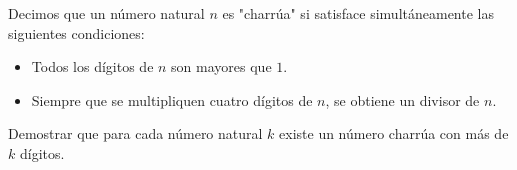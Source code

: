 Decimos que un número natural $n$ es "charrúa" si satisface simultáneamente las siguientes condiciones:
 \begin{itemize} 
   \item  Todos los dígitos de $n$ son mayores que $1$.
   \item  Siempre que se multipliquen cuatro dígitos de $n$, se obtiene un divisor de $n$.
 \end{itemize} 
Demostrar que para cada número natural $k$ existe un número charrúa con más de $k$ dígitos.
